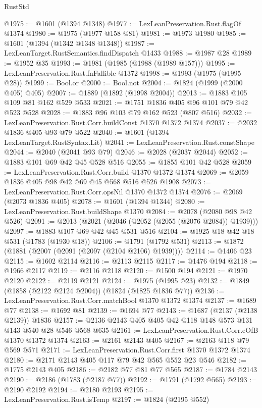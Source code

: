 \begin{lexlean}{RustStd}
\begin{coremodule}
@1975 := @1601 (@1394 @1348)
@1977 := LexLeanPreservation.Rust.flagOf @1374
@1980 := @1975 (@1977 @158 @81)
@1981 := @1973 @1980
@1985 := @1601 (@1394 (@1342 @1348 @1348))
@1987 := LexLeanTarget.RustSemantics.findDispatch @1433
@1988 := @1987 @28
@1989 := @1952 @35
@1993 := @1981 (@1985 (@1988 (@1989 @157)))
@1995 := LexLeanPreservation.Rust.fnFallible @1372
@1998 := @1993 (@1975 (@1995 @28))
@1999 := Bool.or
@2000 := Bool.not
@2004 := @1824 (@1999 (@2000 @405) @405)
@2007 := @1889 (@1892 (@1998 @2004))
@2013 := @1883 @105 @109 @81 @162 @529 @533
@2021 := @1751 @1836 @405 @96 @101 @79 @42 @523 @528
@2028 := @1883 @96 @103 @79 @162 @523 (@807 @516)
@2032 := LexLeanPreservation.Rust.Corr.buildConst @1370 @1372 @1374
@2037 := @2032 @1836 @405 @93 @79 @522
@2040 := @1601 (@1394 LexLeanTarget.RustSyntax.Lit)
@2041 := LexLeanPreservation.Rust.constShape
@2044 := @2040 (@2041 @93 @79)
@2046 := @2028 (@2037 @2044)
@2052 := @1883 @101 @69 @42 @45 @528 @516
@2055 := @1855 @101 @42 @528
@2059 := LexLeanPreservation.Rust.Corr.build @1370 @1372 @1374
@2069 := @2059 @1836 @405 @98 @42 @69 @45 @568 @516 @526 @1908
@2073 := LexLeanPreservation.Rust.Corr.opsNil @1370 @1372 @1374
@2076 := @2069 (@2073 @1836 @405)
@2078 := @1601 (@1394 @1344)
@2080 := LexLeanPreservation.Rust.buildShape @1370
@2084 := @2078 (@2080 @98 @42 @526)
@2091 := @2013 (@2021 (@2046 (@2052 (@2055 (@2076 @2084)) @1939)))
@2097 := @1883 @107 @69 @42 @45 @531 @516
@2104 := @1925 @18 @42 @18 @531 (@1783 (@1930 @18))
@2106 := @1791 (@1792 @531)
@2113 := @1872 (@1881 (@2007 (@2091 (@2097 (@2104 @2106) @1939))))
@2114 := @1406 @23
@2115 := @1602 @2114
@2116 := @2113 @2115
@2117 := @1476 @194
@2118 := @1966 @2117
@2119 := @2116 @2118
@2120 := @1500 @194
@2121 := @1970 @2120
@2122 := @2119 @2121
@2124 := @1975 (@1995 @23)
@2132 := @1849 (@1858 (@2122 @2124 @2004)) (@1824 (@1825 @1836 @77))
@2136 := LexLeanPreservation.Rust.Corr.matchBool @1370 @1372 @1374
@2137 := @1689 @77
@2138 := @1692 @81
@2139 := @1694 @77
@2143 := @1687 (@2137 (@2138 @2139)) @1836
@2157 := @2136 @2143 @405 @405 @42 @118 @148 @573 @131 @143 @540 @28 @546 @568 @635
@2161 := LexLeanPreservation.Rust.Corr.eOfB @1370 @1372 @1374
@2163 := @2161 @2143 @405
@2167 := @2163 @118 @79 @569 @571
@2171 := LexLeanPreservation.Rust.Corr.first @1370 @1372 @1374
@2180 := @2171 @2143 @405 @117 @79 @42 @565 @552 @23 @546
@2182 := @1775 @2143 @405
@2186 := @2182 @77 @81 @77 @565
@2187 := @1784 @2143
@2190 := @2186 (@1783 (@2187 @77))
@2192 := @1791 (@1792 @565)
@2193 := @2190 @2192
@2194 := @2180 @2193
@2195 := LexLeanPreservation.Rust.isTemp
@2197 := @1824 (@2195 @552)

\end{coremodule}
\end{lexlean}
